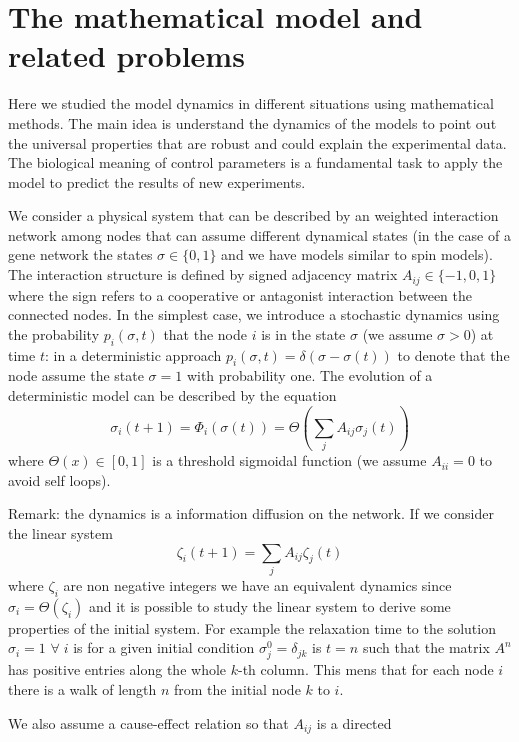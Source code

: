 \section{The mathematical model and related problems}
Here we studied the model dynamics in different situations using mathematical methods. The main idea is understand the dynamics of the models to point
out the universal properties that are robust and could explain the experimental data. The biological meaning of control parameters is a fundamental task
to apply the model to predict the results of new experiments.\par\noindent 
We consider a physical system that can be described by an weighted interaction network among nodes that can assume different
dynamical states (in the case of a gene network the states $\sigma\in \{0,1\}$ and we have models similar to spin models).
The interaction structure is defined by signed adjacency matrix $A_{ij}\in\{-1,0,1\}$ where the sign refers to a cooperative or antagonist interaction between the connected nodes. 
In the simplest case, we introduce a stochastic dynamics using the probability $p_i(\sigma, t)$ that the node $i$ is in the state 
$\sigma$ (we assume $\sigma>0$) at time $t$: in a deterministic approach $p_i(\sigma, t)=\delta(\sigma-\sigma(t))$
to denote that the node assume the state $\sigma=1$ with probability one. The evolution of a deterministic model
can be described by the equation
\begin{equation}
\sigma_i(t+1)=\Phi_i(\sigma(t))=\Theta\left (\sum_j A_{ij}\sigma_j(t)\right )
\label{evolnet}
\end{equation}
where $\Theta(x)\in[0,1]$ is a threshold sigmoidal function (we assume $A_{ii}=0$ to avoid self loops). \par\noindent
Remark: the dynamics is a information diffusion on the network. If we consider the linear system
$$
\zeta_i(t+1)=\sum_j A_{ij}\zeta_j(t)
$$
where $\zeta_i$ are non negative integers we have an equivalent dynamics since $\sigma_i=\Theta(\zeta_i)$ and it is possible
to study the linear system to derive some properties of the initial system. For example the relaxation time to the solution $\sigma_i=1$
$\forall\; i$ is for a given initial condition $\sigma^0_j=\delta_{jk}$ is $t=n$ such that the matrix $A^n$ has positive entries along the whole
$k$-th column. This mens that for each node $i$ there is a walk of length $n$ from the initial node $k$ to $i$.
\par\noindent
We also assume a cause-effect relation so that $A_{ij}$ is a directed
